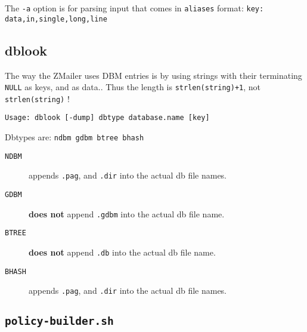 The {\tt -a} option is for parsing input that comes in 
{\tt aliases} format: {\tt key: data,in,single,long,line}




\subsection{dblook}



The way the ZMailer uses DBM entries is by using strings with 
their terminating {\tt NULL} as keys, and as data.. Thus the 
length is {\tt strlen(string)+1}, not {\tt strlen(string)} !

\begin{verbatim}
Usage: dblook [-dump] dbtype database.name [key]
\end{verbatim}


Dbtypes are: {\tt ndbm gdbm btree bhash}

\begin{description}
\item[{\tt NDBM}] \mbox{}

appends {\tt .pag}, and {\tt .dir} 
into the actual db file names.

\item[{\tt GDBM}] \mbox{}

{\bf does not} append {\tt .gdbm} 
into the actual db file name.

\item[{\tt BTREE}] \mbox{}

{\bf does not} append {\tt .db} 
into the actual db file name.

\item[{\tt BHASH}] \mbox{}

appends {\tt .pag}, and {\tt .dir} 
into the actual db file names.

\end{description}



\clearpage
\subsection{{\tt policy-builder.sh}}

